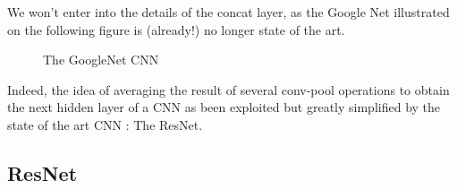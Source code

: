 We won't enter into the details of the concat layer, as the Google Net illustrated on the following figure is (already!) no longer state of the art.


\begin{figure}[H]
\begin{center}
\caption{The GoogleNet CNN}
\end{center}
\end{figure}

Indeed, the idea of averaging the result of several conv-pool operations to obtain the next hidden layer of a CNN as been exploited but greatly simplified by the state of the art CNN : The ResNet.

\subsection{ResNet}

